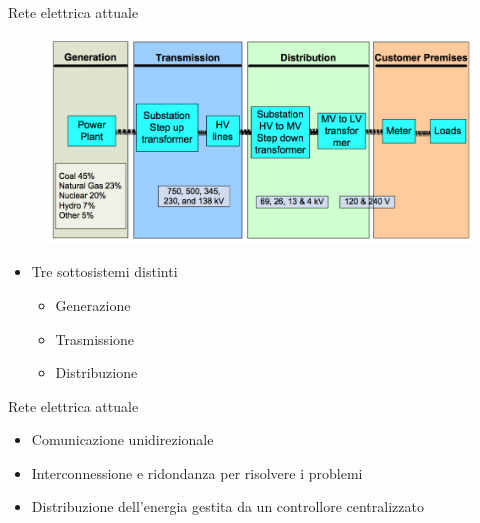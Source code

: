\begin{frame}{Rete elettrica attuale}
	\begin{figure}[h] 
		\includegraphics[scale=0.25, cfbox=blue_slides 1pt 0pt]{imgs/elect_grid.png}
	\end{figure}

\begin{itemize}[<+- | alert@+>]
	\item Tre sottosistemi distinti
		\begin{itemize}
		\item Generazione
		\item Trasmissione
		\item Distribuzione
		\end{itemize}
\end{itemize}
\end{frame}

\begin{frame}{Rete elettrica attuale}
	\begin{itemize}[<+- | alert@+>]
	\item Comunicazione unidirezionale
	\item Interconnessione e ridondanza per risolvere i problemi
	\item Distribuzione dell'energia gestita da un controllore centralizzato
	\end{itemize}

\end{frame}

